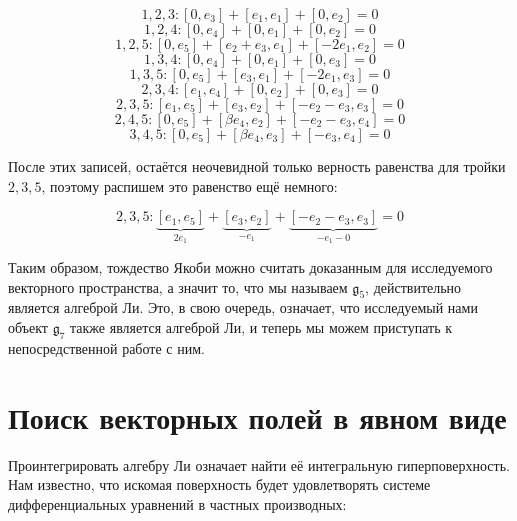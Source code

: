 \documentclass{article}
\begin{document}
\begin{equation*}
1,2,3: [0, e_{3}] + [e_{1}, e_{1}] + [0, e_{2}] = 0
\end{equation*}
\begin{equation*}
1,2,4: [0, e_{4}] + [0, e_{1}] + [0, e_{2}] = 0
\end{equation*}
\begin{equation*}
1,2,5: [0, e_{5}] + [e_{2}+e_{3}, e_{1}] + [-2e_{1}, e_{2}] = 0
\end{equation*}
\begin{equation*}
1,3,4: [0, e_{4}] + [0, e_{1}] + [0, e_{3}] = 0
\end{equation*}
\begin{equation*}
1,3,5: [0, e_{5}] + [e_{3}, e_{1}] + [-2e_{1}, e_{3}] = 0
\end{equation*}
\begin{equation*}
2,3,4: [e_{1}, e_{4}] + [0, e_{2}] + [0, e_{3}] = 0
\end{equation*}
\begin{equation*}
2,3,5: [e_{1}, e_{5}] + [e_{3}, e_{2}] + [-e_{2}-e_{3}, e_{3}] = 0
\end{equation*}
\begin{equation*}
2,4,5: [0, e_{5}] + [\beta e_{4}, e_{2}] + [-e_{2}-e_{3}, e_{4}] = 0
\end{equation*}
\begin{equation*}
3,4,5: [0, e_{5}] + [\beta e_{4}, e_{3}] + [-e_{3}, e_{4}] = 0
\end{equation*}

После этих записей, остаётся неочевидной только верность равенства для тройки $2,3,5$, поэтому распишем это равенство ещё немного:

\begin{equation*}
2,3,5: \underbrace{[e_{1}, e_{5}]}_{2e_{1}} + \underbrace{[e_{3}, e_{2}]}_{-e_{1}} + \underbrace{[-e_{2}-e_{3}, e_{3}]}_{-e_{1}-0} = 0
\end{equation*}

Таким образом, тождество Якоби можно считать доказанным для исследуемого векторного пространства, а значит то, что мы называем $\mathfrak{g}_{5}$, действительно является алгеброй Ли. Это, в свою очередь, означает, что исследуемый нами объект $\mathfrak{g}_{7}$ также является алгеброй Ли, и теперь мы можем приступать к непосредственной работе с ним.

\newpage
\section{Поиск векторных полей в явном виде}
Проинтегрировать алгебру Ли означает найти её интегральную гиперповерхность. Нам известно, что искомая поверхность будет удовлетворять системе дифференциальных уравнений в частных производных:
\end{document}
